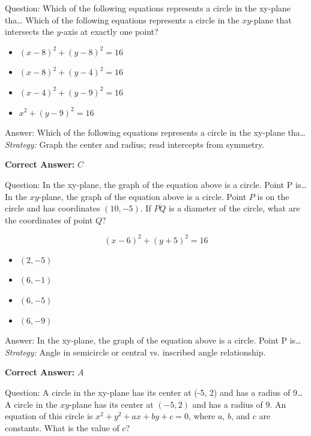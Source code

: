\documentclass{beamer}
\begin{document}
\begin{frame}{Question: Which of the following equations represents a circle in the xy-plane tha…}
Which of the following equations represents a circle in the $xy$-plane that intersects the $y$-axis at exactly one point?
\begin{itemize}
    \item[\textbf{A.}] $(x - 8)^2 + (y - 8)^2 = 16$
    \item[\textbf{B.}] $(x - 8)^2 + (y - 4)^2 = 16$
    \item[\textbf{C.}] $(x - 4)^2 + (y - 9)^2 = 16$
    \item[\textbf{D.}] $x^2 + (y - 9)^2 = 16$
\end{itemize}
\end{frame}
\begin{frame}{Answer: Which of the following equations represents a circle in the xy-plane tha…}
\textit{Strategy:} Graph the center and radius; read intercepts from symmetry.

\textbf{Correct Answer:} \( \boxed{C} \)

\end{frame}
\begin{frame}{Question: In the xy-plane, the graph of the equation above is a circle. Point P is…}
In the $xy$-plane, the graph of the equation above is a circle. Point $P$ is on the circle and has coordinates $(10, -5)$. If $\overline{PQ}$ is a diameter of the circle, what are the coordinates of point $Q$?

\[
(x - 6)^2 + (y + 5)^2 = 16
\]
\begin{itemize}
    \item[\textbf{A.}] $(2, -5)$
    \item[\textbf{B.}] $(6, -1)$
    \item[\textbf{C.}] $(6, -5)$
    \item[\textbf{D.}] $(6, -9)$
\end{itemize}
\end{frame}
\begin{frame}{Answer: In the xy-plane, the graph of the equation above is a circle. Point P is…}
\textit{Strategy:} Angle in semicircle or central vs. inscribed angle relationship.

\textbf{Correct Answer:} \( \boxed{A} \)

\end{frame}
\begin{frame}{Question: A circle in the xy-plane has its center at (-5, 2) and has a radius of 9…}
A circle in the $xy$-plane has its center at $(-5, 2)$ and has a radius of $9$. An equation of this circle is $x^2 + y^2 + ax + by + c = 0$, where $a$, $b$, and $c$ are constants. What is the value of $c$?
\end{frame}
\end{document}
